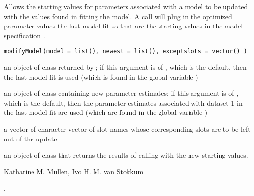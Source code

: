 \documentclass{article}
\begin{document}
\begin{Description}\relax
Allows the starting values for parameters associated with 
a model to be updated with the values found in fitting the model.  
A call 
will plug in the optimized parameter values the last model fit
so that are the starting values in the model specification 
.
\end{Description}
\begin{Usage}
\begin{verbatim}
modifyModel(model = list(), newest = list(), exceptslots = vector() )
\end{verbatim}
\end{Usage}
\begin{Arguments}
\begin{ldescription}
\item[\code{model}] an object of class  returned by ;
if this argument is of , which is the default, then the 
last model fit is used (which is found in the global variable 
)
\item[\code{newest}] an object of class  containing new parameter
estimates;    if this argument is of , which is the default, 
then the parameter estimates associated with dataset 1 in the last model fit
are used (which are found in 
the global variable )
\item[\code{exceptslots}] a vector of character vector of slot names whose 
corresponding slots are to be left out of the update
\end{ldescription}
\end{Arguments}
\begin{Value}
an object of class  that returns the results of 
calling  with the new starting values.
\end{Value}
\begin{Author}\relax
Katharine M. Mullen, Ivo H. M. van Stokkum
\end{Author}
\begin{SeeAlso}\relax
{}, 
\end{SeeAlso}
\end{document}

